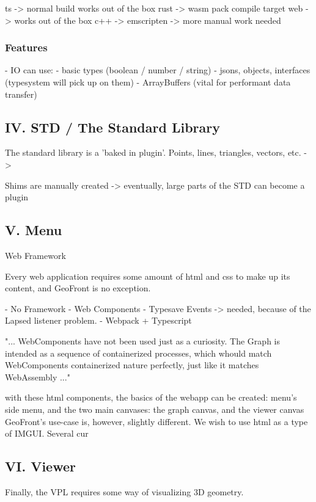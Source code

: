 ts -> normal build works out of the box
rust -> wasm pack compile target web -> works out of the box 
c++ -> emscripten -> more manual work needed 

\subsubsection{Features}
- IO can use:
  - basic types (boolean / number / string)
  - jsons, objects, interfaces (typesystem will pick up on them)
  - ArrayBuffers (vital for performant data transfer)




\subsection{IV. STD / The Standard Library}

The standard library is a 'baked in plugin'.
Points, lines, triangles, vectors, etc.
-> 

Shims are manually created
-> eventually, large parts of the STD can become a plugin




\subsection{V. Menu}
Web Framework

Every web application requires some amount of html and css to make up its content, and GeoFront is no exception. 


- No Framework
- Web Components
- Typesave Events -> needed, because of the Lapsed listener problem.
- Webpack + Typescript

"...
WebComponents have not been used just as a curiosity. 
The Graph is intended as a sequence of containerized processes, 
which whould match WebComponents containerized nature perfectly, just like it matches WebAssembly
..."

with these html components, the basics of the webapp can be created: menu's side menu, and the two main canvases: the graph canvas, and the viewer canvas 
GeoFront's use-case is, however, slightly different. We wish to use html as a type of IMGUI. Several cur




\subsection{VI. Viewer}
Finally, the VPL requires some way of visualizing 3D geometry. 
 

